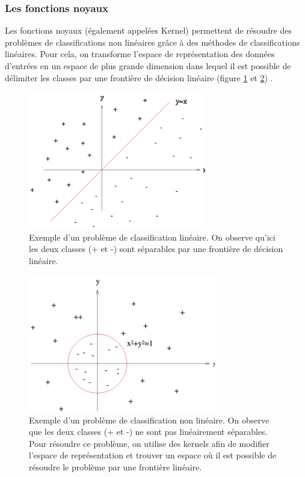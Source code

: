 \subsubsection{Les fonctions noyaux}
\label{Le Machine Learning: Les différents algorithmes: SVM: les fonctions noyaux}
Les fonctions noyaux (également appelées Kernel) permettent de résoudre des problèmes de classifications non linéaires grâce à des méthodes de classifications linéaires. Pour cela, on transforme l'espace de représentation des données d'entrées en un espace de plus grande dimension dans lequel il est possible de délimiter les classes par une frontière de décision linéaire (figure \ref{fig:Svm: Exemple d'un problème de classification linéaire} et \ref{fig:Svm: Exemple d'un problème de classification non linéaire}) .

\begin{figure}[h]
	\centering\includegraphics[height=6cm]{images/svm_regression.png}
	\caption[Exemple d'un problème de classification linéaire]{Exemple d'un problème de classification linéaire. On observe qu'ici les deux classes (+ et -) sont séparables par une frontière de décision linéaire. }
	\label{fig:Svm: Exemple d'un problème de classification linéaire}
\end{figure}

\begin{figure}[h]
	\centering\includegraphics[height=6cm]{images/svm_cercle.png}
	\caption[Exemple d'un problème de classification non linéaire]{Exemple d'un problème de classification non linéaire. On observe que les deux classes (+ et -) ne sont pas linéairement séparables. Pour résoudre ce problème, on utilise des kernels afin de modifier l'espace de représentation et trouver un espace où il est possible de résoudre le problème par une frontière linéaire.}
	\label{fig:Svm: Exemple d'un problème de classification non linéaire}
\end{figure}

